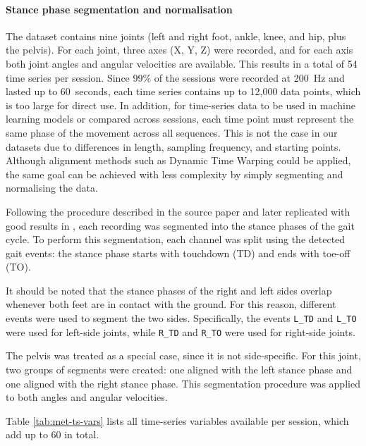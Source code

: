 \paragraph{Stance phase segmentation and normalisation}
The dataset contains nine joints (left and right foot, ankle, knee, and hip, plus the pelvis). For each joint, three axes (X, Y, Z) were recorded, and for each axis both joint angles and angular velocities are available. This results in a total of 54 time series per session. Since 99\% of the sessions were recorded at 200~Hz and lasted up to 60~seconds, each time series contains up to 12,000 data points, which is too large for direct use. In addition, for time-series data to be used in machine learning models or compared across sessions, each time point must represent the same phase of the movement across all sequences. This is not the case in our datasets due to differences in length, sampling frequency, and starting points. Although alignment methods such as Dynamic Time Warping \citep{Bringmann2023} could be applied, the same goal can be achieved with less complexity by simply segmenting and normalising the data.

Following the procedure described in the source paper \citep{Ferber2024} and later replicated with good results in \citep{FuentesJimnez2025}, each recording was segmented into the stance phases of the gait cycle. To perform this segmentation, each \gls{channel} was split using the detected gait events: the stance phase starts with touchdown (TD) and ends with toe-off (TO).

It should be noted that the stance phases of the right and left sides overlap whenever both feet are in contact with the ground. For this reason, different events were used to segment the two sides. Specifically, the events \texttt{L\_TD} and \texttt{L\_TO} were used for left-side joints, while \texttt{R\_TD} and \texttt{R\_TO} were used for right-side joints.

The pelvis was treated as a special case, since it is not side-specific. For this joint, two groups of segments were created: one aligned with the left stance phase and one aligned with the right stance phase. This segmentation procedure was applied to both angles and angular velocities.

Table \ref{tab:met-ts-vars} lists all time-series variables available per session, which add up to 60 in total.

